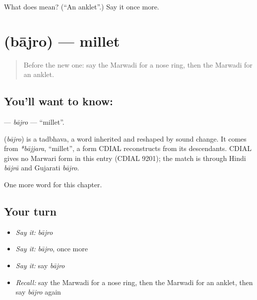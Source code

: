 \begin{tcolorbox}[breakable,colback=teal!4,colframe=teal!35!black,title={Before you move on}]
What does  mean? (\textquotedblleft{}An anklet\textquotedblright{}.) Say it once more.
\end{tcolorbox}
\section[\texorpdfstring{\mw{बाजरो} (bājro)}{बाजरो (bājro)}]{ (bājro) — millet}

\label{lesson:MW-C130-bajro}



\begin{quote}
Before the new one: say the Marwadi for a nose ring, then the Marwadi for an anklet.
\end{quote}

\subsection*{You'll want to know: }
\textbf{} — \emph{bājro} — \textquotedblleft{}millet\textquotedblright{}.

\begin{cousinweb}
\textbf{} (\emph{bājro}) is a tadbhava, a word inherited and reshaped by sound change. It comes from \emph{*bājjara}, \textquotedblleft{}millet\textquotedblright{}, a form CDIAL reconstructs from its descendants. CDIAL gives no Marwari form in this entry (CDIAL 9201); the match is through Hindi \emph{bājrā} and Gujarati \emph{bājro}.
\end{cousinweb}

\begin{grammarlens}[title={What you've built}]
One more word for this chapter.
\end{grammarlens}

\subsection*{Your turn}
\begin{itemize}
\raggedright
  \item \emph{Say it:} \emph{bājro}
  \item \emph{Say it:} \emph{bājro}, once more
  \item \emph{Say it:} say \emph{bājro}
  \item \emph{Recall:} say the Marwadi for a nose ring, then the Marwadi for an anklet, then say \emph{bājro} again
\end{itemize}

